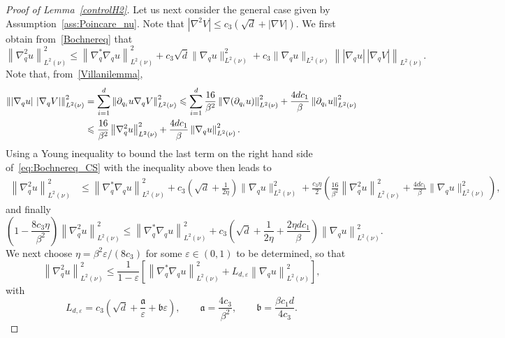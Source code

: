 \documentclass{article}
\renewcommand{\leq}{\leqslant}
\begin{document}
\begin{proof}[Proof of Lemma~\ref{controlH2}]
Let us next consider the general case given by Assumption~\ref{ass:Poincare_nu}. Note that $|\nabla^2 V|\leq c_3(\sqrt{d}+|\nabla V|)$. We first obtain from~\eqref{Bochnereq} that
\begin{equation}
  \label{eq:Bochnereq_CS}
  \left\|\nabla_q^2 u\right\|_{L^2(\nu)}^2 \leq \left\|\nabla_q^{*}\nabla_q u \right\|_{L^2(\nu)}^2+ c_{3}\sqrt{d}\|\nabla_q u\|_{L^2(\nu)}^2 + c_{3}\|\nabla_q u\|_{L^2(\nu)}\left\| \left|\nabla_{q}u\right| \, \left| \nabla_{q}V\right| \right\|_{L^2(\nu)}.
\end{equation}
Note that, from~\eqref{Villanilemma},
\[
  \begin{aligned}
    \left\| \left|\nabla_{q}u\right| \, \left| \nabla_{q}V\right| \right\|_{L^2(\nu)}^2 & = \sum_{i=1}^d \left\| \partial_{q_i}u \nabla_{q}V \right\|_{L^2(\nu)}^2 \leq \sum_{i=1}^d \frac{16}{\beta^2} \left\|\nabla \qty(\partial_{q_i}u) \right\|^2_{L^2\qty(\nu)} + \frac{4d c_1}{\beta} \left\|\partial_{q_i}u \right\|^2_{L^2\qty(\nu)} \\
    & \leq \frac{16}{\beta^2} \left\|\nabla_q^2 u \right\|^2_{L^2\qty(\nu)} + \frac{4d c_1}{\beta} \left\|\nabla_q u \right\|^2_{L^2\qty(\nu)}.
  \end{aligned}
\]
Using a Young inequality to bound the last term on the right hand side of~\eqref{eq:Bochnereq_CS} with the inequality above then leads to
\[
  \begin{aligned}
    \left\|\nabla_q^2 u\right\|_{L^2(\nu)}^2 & \leq \left\|\nabla_q^{*}\nabla_q u \right\|_{L^2(\nu)}^2+ c_{3} \left( \sqrt{d}+ \frac{1}{2\eta} \right) \|\nabla_q u\|_{L^2(\nu)}^2 + \frac{c_3 \eta}{2} \left(\frac{16}{\beta^2} \left\|\nabla_q^2u\right\|_{L^2(\nu)}^2 + \frac{4dc_1}{\beta} \|\nabla_q u\|_{L^2(\nu)}^2\right),
  \end{aligned}
\]
and finally
\[
\left(1 - \frac{8c_3 \eta}{\beta^2}\right)\left\|\nabla_q^2 u\right\|_{L^2(\nu)}^2 \leq \left\|\nabla_q^{*}\nabla_q u \right\|_{L^2(\nu)}^2 + c_3\left(\sqrt{d}+\frac{1}{2\eta} + \frac{2\eta dc_1}{\beta} \right) \left\|\nabla_q u\right\|_{L^2(\nu)}^2.
\]
We next choose $\eta = \beta^2\varepsilon/(8c_3)$ for some $\varepsilon \in (0,1)$ to be determined, so that 
\[
  \left\|\nabla_q^2 u\right\|_{L^2(\nu)}^2 \leq \frac{1}{1-\varepsilon} \left[\left\|\nabla_q^{*}\nabla_q u \right\|_{L^2(\nu)}^2 + L_{d,\varepsilon} \left\|\nabla_q u\right\|_{L^2(\nu)}^2\right],
\]
with 
\[
  L_{d,\varepsilon} = c_3\left(\sqrt{d}+\frac{\mathfrak{a}}{\varepsilon} +  \mathfrak{b} \varepsilon \right),
  \qquad
  \mathfrak{a} = \frac{4c_3}{\beta^2}, \qquad \mathfrak{b} = \frac{\beta c_1 d}{4 c_3}.
\]
\end{proof}
\end{document}
